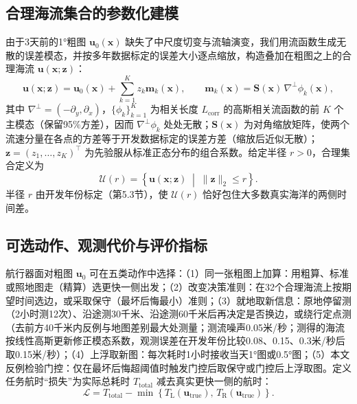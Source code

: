 \subsection{合理海流集合的参数化建模}
由于3天前的1°粗图 $\boldsymbol{u}_0(\boldsymbol{x})$ 缺失了中尺度切变与流轴演变，我们用流函数生成无散的误差模态，并按多年数据标定的误差大小逐点缩放，构造叠加在粗图之上的合理海流 $\boldsymbol{u}(\boldsymbol{x}; \boldsymbol{z})$：
\begin{equation}
\boldsymbol{u}(\boldsymbol{x}; \boldsymbol{z}) = \boldsymbol{u}_0(\boldsymbol{x}) + \sum_{k=1}^{K} z_k \boldsymbol{m}_k(\boldsymbol{x}), \qquad \boldsymbol{m}_k(\boldsymbol{x}) = \mathbf{S}(\boldsymbol{x})\, \nabla^{\perp}\phi_k(\boldsymbol{x}),
\label{eq:plausible_field}
\end{equation}
其中 $\nabla^{\perp} = (-\partial_y, \partial_x)$，$\{\phi_k\}_{k=1}^{K}$ 为相关长度 $L_{\text{corr}}$ 的高斯相关流函数的前 $K$ 个主模态（保留95\%方差），因而 $\nabla^{\perp}\phi_k$ 处处无散；$\mathbf{S}(\boldsymbol{x})$ 为对角缩放矩阵，使两个流速分量在各点的方差等于开发数据标定的误差方差（缩放后近似无散）；$\boldsymbol{z} = (z_1, \dots, z_K)^{\top}$ 为先验服从标准正态分布的组合系数。给定半径 $r > 0$，合理集合定义为
\begin{equation}
\mathcal{U}(r) = \left\{ \boldsymbol{u}(\boldsymbol{x}; \boldsymbol{z}) \;\middle|\; \|\boldsymbol{z}\|_2 \le r \right\}.
\label{eq:plausible_set}
\end{equation}
半径 $r$ 由开发年份标定（第5.3节），使 $\mathcal{U}(r)$ 恰好包住大多数真实海洋的两侧时间差。

\subsection{可选动作、观测代价与评价指标}
航行器面对粗图 $\boldsymbol{u}_0$ 可在五类动作中选择：（1）同一张粗图上加算：用粗算、标准或照地图走（精算）选更快一侧出发；（2）改变决策准则：在32个合理海流上按期望时间选边，或采取保守（最坏后悔最小）准则；（3）就地取新信息：原地停留测（2小时测12次）、沿途测30千米、沿途测60千米后再决定是否换边，或绕行定点测（去前方40千米内反例与地图差别最大处测量；测流噪声0.05米/秒；测得的海流按线性高斯更新修正模态系数，观测误差在开发年份比较0.08、0.15、0.3米/秒后取0.15米/秒）；（4）上浮取新图：每次耗时1小时接收当天1°图或0.5°图；（5）本文反例检验门控：仅在最坏后悔超阈值时触发门控后取保守或门控后上浮取图。定义任务航时“损失”为实际总耗时 $T_{\text{total}}$ 减去真实更快一侧的航时：
\begin{equation}
\mathcal{L} = T_{\text{total}} - \min\left\{ T_{\text{L}}(\boldsymbol{u}_{\text{true}}),\, T_{\text{R}}(\boldsymbol{u}_{\text{true}}) \right\}.
\label{eq:loss}
\end{equation}

